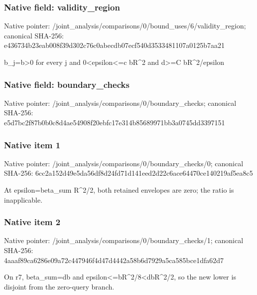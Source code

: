 \documentclass[10pt,a4paper]{article}
\begin{document}
\subsubsection{Native field: validity\_\allowbreak{}region}
Native pointer: /joint\_\allowbreak{}analysis/comparisons/0/bound\_\allowbreak{}uses/6/validity\_\allowbreak{}region; canonical SHA-256: e436734b23eab008f39d302c76c0abecdb07ecf540d3533481107a0125b7aa21

\begingroup\raggedright\sloppy b\_\allowbreak{}j=\allowbreak{}b>0 for every j and 0<epsilon<=\allowbreak{}c bR\textasciicircum{}2 and d>=\allowbreak{}C bR\textasciicircum{}2/\allowbreak{}epsilon\par\endgroup

\subsubsection{Native field: boundary\_\allowbreak{}checks}
Native pointer: /joint\_\allowbreak{}analysis/comparisons/0/boundary\_\allowbreak{}checks; canonical SHA-256: e5d7bc2f87b0b0c8d4ae54908f20ebfc17e314b85689971bb3a0745dd3397151

\subsubsection{Native item 1}
Native pointer: /joint\_\allowbreak{}analysis/comparisons/0/boundary\_\allowbreak{}checks/0; canonical SHA-256: 6cc2a152d49e5da56df8d24fd71d141eed2d22c6ace64470ce140219af5ea8c5

\begingroup\raggedright\sloppy At epsilon=\allowbreak{}beta\_\allowbreak{}sum R\textasciicircum{}2/\allowbreak{}2,\allowbreak{} both retained envelopes are zero;\allowbreak{} the ratio is inapplicable.\par\endgroup

\subsubsection{Native item 2}
Native pointer: /joint\_\allowbreak{}analysis/comparisons/0/boundary\_\allowbreak{}checks/1; canonical SHA-256: 4aaaf89ca6286e09a72c447946f4d47d4442a58b6d7929a5ca585bce1dfa62d7

\begingroup\raggedright\sloppy On r7,\allowbreak{} beta\_\allowbreak{}sum=\allowbreak{}db and epsilon<=\allowbreak{}bR\textasciicircum{}2/\allowbreak{}8<dbR\textasciicircum{}2/\allowbreak{}2,\allowbreak{} so the new lower is disjoint from the zero-query branch.\par\endgroup
\end{document}
